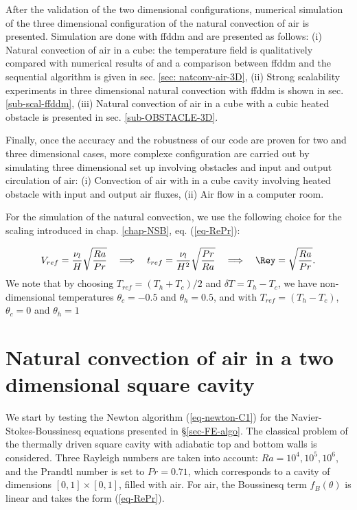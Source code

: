 After the validation of the two dimensional configurations, numerical simulation of the three dimensional configuration of the natural convection of air is presented. 
Simulation are done with ffddm and are presented as follows: \newline{}
(i) Natural convection of air in a cube: the temperature field is qualitatively compared with numerical results of \cite{Wakashima-2004} and a comparison between ffddm and the sequential algorithm is given in 
sec. \ref{sec: natconv-air-3D}, \newline{}
(ii) Strong scalability experiments in three dimensional natural convection with ffddm is shown in sec. \ref{sub-scal-ffddm}, \newline{}
(iii) Natural convection of air in a cube with a cubic heated obstacle is presented in sec. \ref{sub-OBSTACLE-3D}.

Finally, once the accuracy and the robustness of our code are proven for two and three dimensional cases, more complexe configuration are carried out by simulating three dimensional set up involving obstacles and input and output circulation of air:\newline{}
(i) Convection of air with in a cube cavity involving heated obstacle with input and output air fluxes, \newline{}
(ii) Air flow in a computer room.

For the simulation of the natural convection, we use the following choice for the scaling introduced in chap. \ref{chap-NSB}, eq. (\ref{eq-RePr}):

\begin{equation}
   V_{ref} = \frac{\nu_l}{H} \sqrt{\frac{Ra}{Pr}} 
   \quad \Longrightarrow \quad t_{ref} = \frac{\nu_l}{H^2} \sqrt{\frac{Pr}{Ra}} 
   \quad \Longrightarrow \quad \Rey = \sqrt{\frac{Ra}{Pr}}.
\end{equation} 
We note that by choosing $T_{ref} = (T_h + T_c)/2$ and $\delta T = T_h - T_c$, we have non-dimensional temperatures $\theta_c = -0.5$ and $\theta_h = 0.5$,
and with $T_{ref} = (T_h - T_c)$, $\theta_c = 0$ and $\theta_h = 1$


\section{Natural convection of air in a two dimensional square cavity}\label{sec: natconv-air-2D}
We start by testing the Newton algorithm (\ref{eq-newton-C1}) for the Navier-Stokes-Boussinesq  equations presented in \S \ref{sec-FE-algo}.
The classical problem of the thermally driven square cavity with adiabatic top and bottom walls is considered.
Three Rayleigh numbers are taken into account: $Ra = 10^4, 10^5, 10^6$, and the Prandtl number is set to $Pr = 0.71$, which corresponds to a cavity of dimensions $[ 0 , 1] \times [ 0 , 1]$, filled with air.
For air, the Boussinesq term $f_B(\theta)$ is linear and takes the form (\ref{eq-RePr}).

